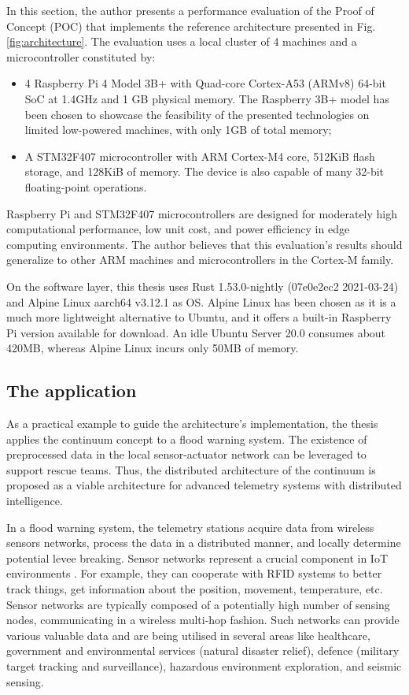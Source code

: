 In this section, the author presents a performance evaluation of the Proof of Concept (POC) that implements the reference architecture presented in Fig. \ref{fig:architecture}. The evaluation uses a local cluster of 4 machines and a microcontroller constituted by:

\begin{itemize}
    \item 4 Raspberry Pi 4 Model 3B+ with Quad-core Cortex-A53 (ARMv8) 64-bit SoC at 1.4GHz and 1 GB physical memory. The Raspberry 3B+ model has been chosen to showcase the feasibility of the presented technologies on limited low-powered machines, with only 1GB of total memory;
    \item A STM32F407 microcontroller with ARM Cortex-M4 core, 512KiB flash storage, and 128KiB of memory. The device is also capable of many 32-bit floating-point operations.
\end{itemize}

Raspberry Pi and STM32F407 microcontrollers are designed for moderately high computational performance, low unit cost, and power efficiency in edge computing environments. The author believes that this evaluation's results should generalize to other ARM machines and microcontrollers in the Cortex-M family.

On the software layer, this thesis uses Rust 1.53.0-nightly (07e0e2ec2 2021-03-24) and Alpine Linux aarch64 v3.12.1 as OS. Alpine Linux has been chosen as it is a much more lightweight alternative to Ubuntu, and it offers a built-in Raspberry Pi version available for download. An idle Ubuntu Server 20.0 consumes about 420MB, whereas Alpine Linux incurs only 50MB of memory.

\subsection{The application}

As a practical example to guide the architecture's implementation, the thesis applies the continuum concept to a flood warning system. The existence of preprocessed data in the local sensor-actuator network can be leveraged to support rescue teams. Thus, the distributed architecture of the continuum is proposed as a viable architecture for advanced telemetry systems with distributed intelligence.

In a flood warning system, the telemetry stations acquire data from wireless sensors networks, process the data in a distributed manner, and locally determine potential levee breaking. Sensor networks represent a crucial component in IoT environments \cite{edge-computing-survey}. For example, they can cooperate with RFID systems to better track things, get information about the position, movement, temperature, etc. Sensor networks are typically composed of a potentially high number of sensing nodes, communicating in a wireless multi-hop fashion. Such networks can provide various valuable data and are being utilised in several areas like healthcare, government and environmental services (natural disaster relief), defence (military target tracking and surveillance), hazardous environment exploration, and seismic sensing.

